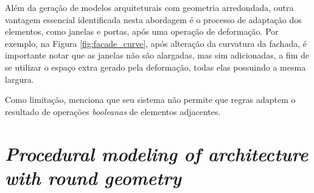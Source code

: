 \begin{figure}[h!]
	\centering
	\captionsetup{width=15cm}
	{}	
\end{figure}

\newpage

Além da geração de modelos arquiteturais com geometria arredondada, outra vantagem essencial identificada nesta abordagem é o processo de adaptação dos elementos, como janelas e portas, após uma operação de deformação. Por exemplo, na Figura \ref{fig:facade_curve}, após alteração da curvatura da fachada, é importante notar que as janelas não são alargadas, mas sim adicionadas, a fim de se utilizar o espaço extra gerado pela deformação, todas elas possuindo a mesma largura.

Como limitação,  menciona que seu sistema não permite que regras adaptem o resultado de operações \textit{booleanas} de elementos adjacentes.

\section{\textit{Procedural modeling of architecture with round geometry}}
\label{sec:paper_edelsbrunner2017} %

